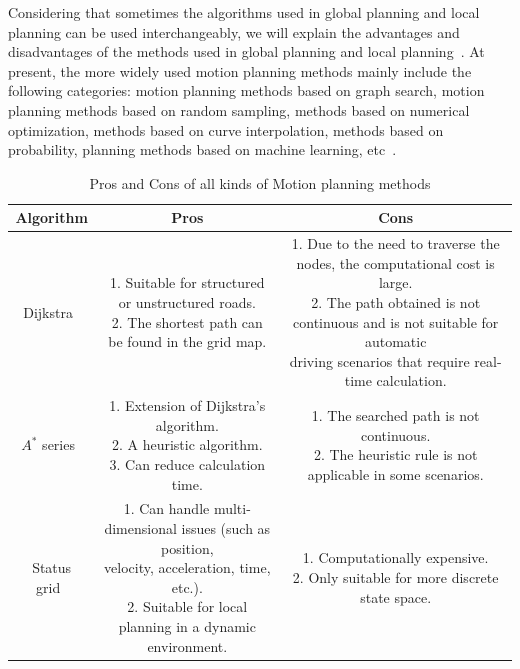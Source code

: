 \documentclass[conference]{IEEEtran}
\begin{document}
Considering that sometimes the algorithms used in global planning and local planning can be used interchangeably, we will explain the advantages and disadvantages of the methods used in global planning and local planning~\cite{Brian2016}. At present, the more widely used motion planning methods mainly include the following categories: motion planning methods based on graph search, motion planning methods based on random sampling, methods based on numerical optimization, methods based on curve interpolation, methods based on probability, planning methods based on machine learning, etc~\cite{Brian2016}.

\begin{table}[htbp]
	\centering
	\caption{\label{tab:motion_planning}Pros and Cons of all kinds of Motion planning methods
	}
	\setlength{\tabcolsep}{4pt}
	\begin{tabular}{|c|c|c|}%
		\hline
		\multicolumn{1}{|c|}{\textbf{Algorithm}} & \multicolumn{1}{|c|}{\textbf{Pros}} & \multicolumn{1}{|c|}{\textbf{Cons}} \\
		\hline
		Dijkstra~\cite{dijkstra1959note} & \makecell[l]{1. Suitable for structured or unstructured roads. \\ 2. The shortest path can be found in the grid map.\\}  & \makecell[l]{1. Due to the need to traverse the nodes, the computational cost is large.\\ 2. The path obtained is not continuous and is not suitable for automatic\\ driving scenarios that require real-time calculation.}\\
		\hline
		$A^*$ series~\cite{Hart1968formal} & \makecell[l]{1. Extension of Dijkstra's algorithm. \\ 2. A heuristic algorithm.\\ 3. Can reduce calculation time. \\}  & \makecell[l]{1. The searched path is not continuous.\\ 2. The heuristic rule is not applicable in some scenarios.}\\
		\hline
		Status grid~\cite{Pivtoraiko2005} & \makecell[l]{1. Can handle multi-dimensional issues (such as position,\\ velocity, acceleration, time, etc.). \\ 2. Suitable for local planning in a dynamic environment.\\}  & \makecell[l]{1. Computationally expensive.\\ 2. Only suitable for more discrete state space.}\\

\end{tabular}
\end{table}
\end{document}
